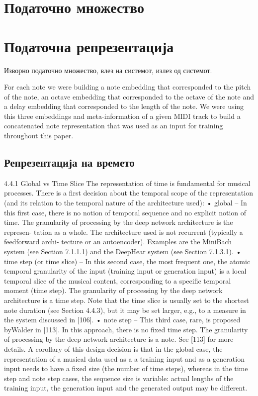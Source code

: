 \section{Податочно множество}

\section{Податочна репрезентација }

Изворно податочно множество, влез на системот, излез од системот. 

\cite{Tikhonov2017} For each note we were building a note embedding that corresponded to the pitch of the note, an octave embedding that corresponded to the octave of the note and a delay embedding that corresponded to the length of the note. We were using this three embeddings and meta-information of a given MIDI track to build a concatenated note representation that was used as an input for training throughout this paper.

\subsection{Репрезентација на времето}
4.4.1 Global vs Time Slice
The representation of time is fundamental for musical processes. There is a first decision about the temporal scope of the representation (and its relation to the temporal nature of the architecture used):
• global – In this first case, there is no notion of temporal sequence and no explicit notion of time. The granularity of processing by the deep network architecture is the represen-
tation as a whole. The architecture used is not recurrent (typically a feedforward archi- tecture or an autoencoder). Examples are the MiniBach system (see Section 7.1.1.1) and the DeepHear system (see Section 7.1.3.1).
• time step (or time slice) – In this second case, the most frequent one, the atomic temporal granularity of the input (training input or generation input) is a local temporal slice
of the musical content, corresponding to a specific temporal moment (time step). The granularity of processing by the deep network architecture is a time step. Note that the time slice is usually set to the shortest note duration (see Section 4.4.3), but it may be set larger, e.g., to a measure in the system discussed in [106].
• note step – This third case, rare, is proposed byWalder in [113]. In this approach, there is no fixed time step. The granularity of processing by the deep network architecture is
a note. See [113] for more details. A corollary of this design decision is that in the global case, the representation of a
musical data used as a a training input and as a generation input needs to have a fixed size (the number of time steps), whereas in the time step and note step cases, the sequence size is variable: actual lengths of the training input, the generation input and the generated output may be different.

